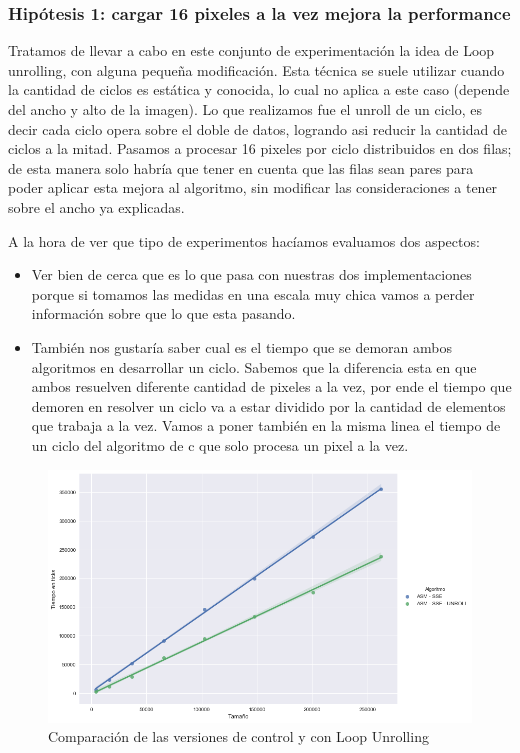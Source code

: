 \subsubsection*{Hipótesis 1: cargar 16 pixeles a la vez mejora la performance}
Tratamos de llevar a cabo en este conjunto de experimentación la idea de Loop unrolling, con alguna pequeña modificación. Esta técnica se suele utilizar cuando la cantidad de ciclos es estática y conocida, lo cual no aplica a este caso (depende del ancho y alto de la imagen). Lo que realizamos fue el unroll de un ciclo, es decir cada ciclo opera sobre el doble de datos, logrando asi reducir la cantidad de ciclos a la mitad. Pasamos a procesar 16 pixeles por ciclo distribuidos en dos filas; de esta manera solo habría que tener en cuenta que las filas sean pares para poder aplicar esta mejora al algoritmo, sin modificar las consideraciones a tener sobre el ancho ya explicadas.

A la hora de ver que tipo de experimentos hacíamos evaluamos dos aspectos:

\begin{itemize}
	\item Ver bien de cerca que es lo que pasa con nuestras dos implementaciones porque si tomamos las medidas en una escala muy chica vamos a perder información sobre que lo que esta pasando. 

	\item También nos gustaría saber cual es el tiempo que se demoran ambos algoritmos en desarrollar un ciclo. Sabemos que la diferencia esta en que ambos resuelven diferente cantidad de  pixeles a la vez, por ende el tiempo que demoren en resolver un ciclo va a estar dividido por la cantidad de elementos que trabaja a la vez. Vamos a poner también en la misma linea el tiempo de un ciclo del algoritmo de c que solo procesa un pixel a la vez.
\end{itemize}

\begin{figure}[H]
	\centering
	\includegraphics[scale=0.5]{img/fourCombine_UnrollvsNormal_asmOnly.png}
	\caption{Comparación de las versiones de control y con Loop Unrolling}
	\label{fourCombine_unroolvsnormal}
\end{figure}

